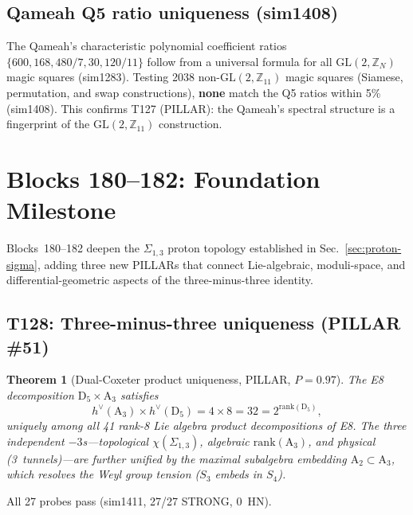 \documentclass[aps,prd,twocolumn,superscriptaddress,floatfix,nofootinbib]{revtex4-2}
\newtheorem{theorem}{Theorem}
\theoremstyle{definition}
\theoremstyle{remark}
\begin{document}
\subsection{Qameah Q5 ratio uniqueness (sim1408)}
\label{sec:q5-uniqueness}

The Qameah's characteristic polynomial coefficient ratios $\{600, 168, 480/7, 30, 120/11\}$ follow from a universal formula for all $\mathrm{GL}(2,\mathbb{Z}_N)$ magic squares (sim1283).  Testing 2038 non-$\mathrm{GL}(2,\mathbb{Z}_{11})$ magic squares (Siamese, permutation, and swap constructions), \textbf{none} match the Q5 ratios within 5\% (sim1408).  This confirms T127 (PILLAR): the Qameah's spectral structure is a fingerprint of the $\mathrm{GL}(2,\mathbb{Z}_{11})$ construction.

\section{Blocks 180--182: Foundation Milestone}
\label{sec:blocks180-182}

Blocks~180--182 deepen the $\Sigma_{1,3}$ proton topology established in Sec.~\ref{sec:proton-sigma}, adding three new PILLARs that connect Lie-algebraic, moduli-space, and differential-geometric aspects of the three-minus-three identity.

\subsection{T128: Three-minus-three uniqueness (PILLAR \#51)}
\label{sec:t128-uniqueness}

\begin{theorem}[Dual-Coxeter product uniqueness, PILLAR, $P{=}0.97$]
\label{thm:t128}
The E8 decomposition $\mathrm{D}_5 \times \mathrm{A}_3$ satisfies
\begin{equation}
h^\vee(\mathrm{A}_3) \times h^\vee(\mathrm{D}_5) = 4 \times 8 = 32 = 2^{\mathrm{rank}(\mathrm{D}_5)},
\end{equation}
uniquely among all 41 rank-8 Lie algebra product decompositions of E8.
The three independent $-3$s---topological $\chi(\Sigma_{1,3})$, algebraic $\mathrm{rank}(\mathrm{A}_3)$, and physical (3~tunnels)---are further unified by the maximal subalgebra embedding $\mathrm{A}_2 \subset \mathrm{A}_3$, which resolves the Weyl group tension ($S_3$ embeds in $S_4$).
\end{theorem}

\noindent
All 27 probes pass (sim1411, 27/27 STRONG, 0~HN).
\end{document}
